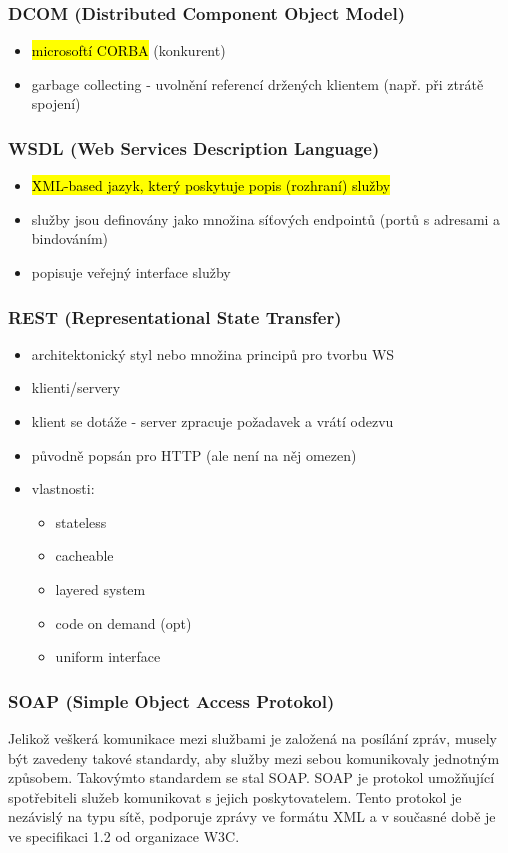 \subsubsection*{DCOM (Distributed Component Object Model)}
\begin{itemize}[itemsep=0px]
\item \hl{microsoftí CORBA} (konkurent)
\item garbage collecting - uvolnění referencí držených klientem (např. při ztrátě spojení)
\end{itemize}
\subsubsection*{WSDL (Web Services Description Language)}
\begin{itemize}[itemsep=0px]
\item \hl{XML-based jazyk, který poskytuje popis (rozhraní) služby}
\item služby jsou definovány jako množina síťových endpointů (portů s adresami a bindováním)
\item popisuje veřejný interface služby
\end{itemize}
\subsubsection*{REST (Representational State Transfer)}
\begin{itemize}[itemsep=0px]
\item architektonický styl nebo množina principů pro tvorbu WS
\item klienti/servery
\item klient se dotáže - server zpracuje požadavek a vrátí odezvu
\item původně popsán pro HTTP (ale není na něj omezen)
\item vlastnosti:
\begin{itemize}[itemsep=0px]
\item stateless
\item cacheable
\item layered system
\item code on demand (opt)
\item uniform interface
\end{itemize}
\end{itemize}
\subsubsection*{SOAP (Simple Object Access Protokol)}
Jelikož veškerá komunikace mezi službami je založená na posílání zpráv, musely být zavedeny takové standardy, aby služby mezi sebou komunikovaly jednotným způsobem. Takovýmto standardem se stal SOAP. SOAP je protokol umožňující spotřebiteli služeb komunikovat s jejich poskytovatelem. Tento protokol je nezávislý na typu sítě, podporuje zprávy ve formátu XML a v současné době je ve specifikaci 1.2 od organizace W3C.

